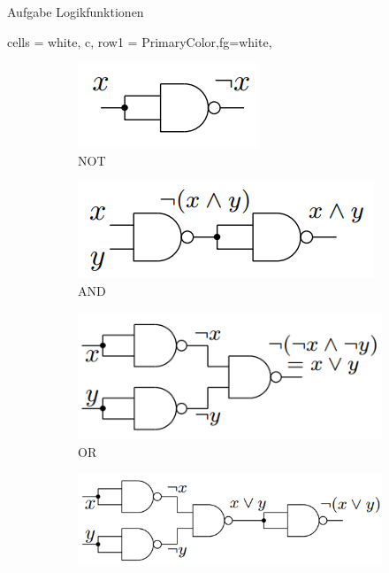 \begin{frame}[allowframebreaks]{Aufgabe \thesection}{Logikfunktionen}
\begin{solution}
{\begin{minipage}[t]{30cm}
\begin{table}
\begin{tblr}{
          cells = {white, c},
          row{1} = {PrimaryColor,fg=white},
        }
        \end{tblr}
        \end{table}
      \end{minipage}
    }
  \end{solution}
  \begin{solutionnoinc}
    \begin{figure}
      \begin{subfigure}{0.3\linewidth}
        \includegraphics[width=0.6\linewidth, center]{./figures/not.png}
        \caption{NOT}
      \end{subfigure}
      \begin{subfigure}{0.3\linewidth}
        \includegraphics[width=0.9\linewidth, center]{./figures/and.png}
        \caption{AND}
      \end{subfigure}
      \begin{subfigure}{0.3\linewidth}
        \includegraphics[width=\linewidth, center]{./figures/or.png}
        \caption{OR}
      \end{subfigure}
      \begin{subfigure}{0.3\linewidth}
        \includegraphics[width=\linewidth, center]{./figures/nor.png}

\end{subfigure}
\end{figure}
\end{solutionnoinc}
\end{frame}
